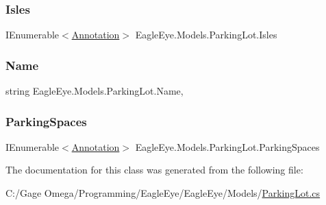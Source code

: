 \mbox{\label{class_eagle_eye_1_1_models_1_1_parking_lot_ac1070fa7799989793d2b8cf0c54318b3}} 
\subsubsection{\texorpdfstring{Isles}{Isles}}
{\footnotesize\ttfamily I\+Enumerable$<$\mbox{\hyperlink{class_eagle_eye_1_1_models_1_1_annotation}{Annotation}}$>$ Eagle\+Eye.\+Models.\+Parking\+Lot.\+Isles\hspace{0.3cm}{\ttfamily [get]}}

\mbox{\label{class_eagle_eye_1_1_models_1_1_parking_lot_ac2860bd9c6046f6f6b9b10461c0b4619}} 
\subsubsection{\texorpdfstring{Name}{Name}}
{\footnotesize\ttfamily string Eagle\+Eye.\+Models.\+Parking\+Lot.\+Name\hspace{0.3cm}{\ttfamily [get]}, {\ttfamily [set]}}

\mbox{\label{class_eagle_eye_1_1_models_1_1_parking_lot_af3127595a546a4f0b4c4dcda6e72fc3f}} 
\subsubsection{\texorpdfstring{ParkingSpaces}{ParkingSpaces}}
{\footnotesize\ttfamily I\+Enumerable$<$\mbox{\hyperlink{class_eagle_eye_1_1_models_1_1_annotation}{Annotation}}$>$ Eagle\+Eye.\+Models.\+Parking\+Lot.\+Parking\+Spaces\hspace{0.3cm}{\ttfamily [get]}}



The documentation for this class was generated from the following file\+:\begin{DoxyCompactItemize}
\item 
C\+:/\+Gage Omega/\+Programming/\+Eagle\+Eye/\+Eagle\+Eye/\+Models/\mbox{\hyperlink{_models_2_parking_lot_8cs}{Parking\+Lot.\+cs}}\end{DoxyCompactItemize}
